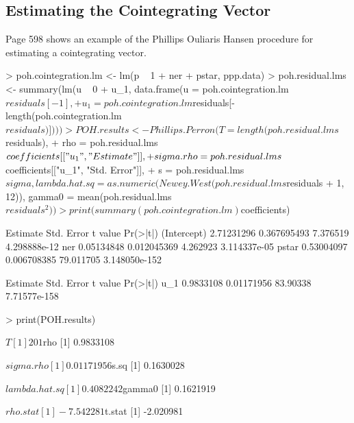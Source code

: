 \subsection{Estimating the Cointegrating Vector}
Page 598 shows an example of the Phillips Ouliaris Hansen procedure for estimating a cointegrating vector.
\begin{Schunk}
\begin{Sinput}
> poh.cointegration.lm <- lm(p ~ 1 + ner + pstar, ppp.data)
> poh.residual.lms <- summary(lm(u ~ 0 + u_1, data.frame(u = poh.cointegration.lm$residuals[-1], 
+     u_1 = poh.cointegration.lm$residuals[-length(poh.cointegration.lm$residuals)])))
> POH.results <- Phillips.Perron(T = length(poh.residual.lms$residuals), 
+     rho = poh.residual.lms$coefficients[["u_1", "Estimate"]], 
+     sigma.rho = poh.residual.lms$coefficients[["u_1", "Std. Error"]], 
+     s = poh.residual.lms$sigma, lambda.hat.sq = as.numeric(Newey.West(poh.residual.lms$residuals %
+         1, 12)), gamma0 = mean(poh.residual.lms$residuals^2))
> print(summary(poh.cointegration.lm)$coefficients)
\end{Sinput}
\begin{Soutput}
              Estimate  Std. Error   t value      Pr(>|t|)
(Intercept) 2.71231296 0.367695493  7.376519  4.298888e-12
ner         0.05134848 0.012045369  4.262923  3.114337e-05
pstar       0.53004097 0.006708385 79.011705 3.148050e-152
\end{Soutput}
\begin{Soutput}
     Estimate Std. Error  t value     Pr(>|t|)
u_1 0.9833108 0.01171956 83.90338 7.71577e-158
\end{Soutput}
\begin{Sinput}
> print(POH.results)
\end{Sinput}
\begin{Soutput}
$T
[1] 201

$rho
[1] 0.9833108

$sigma.rho
[1] 0.01171956

$s.sq
[1] 0.1630028

$lambda.hat.sq
[1] 0.4082242

$gamma0
[1] 0.1621919

$rho.stat
[1] -7.542281

$t.stat
[1] -2.020981
\end{Soutput}
\end{Schunk}
